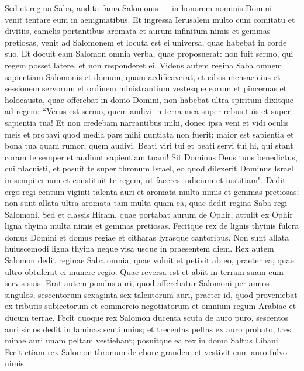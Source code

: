 \begin{biblechapter}  
\verse Sed et regina Saba, audita fama Salomonis — in honorem nominis Domini — venit tentare eum in aenigmatibus. 
\verse Et ingressa Ierusalem multo cum comitatu et divitiis, camelis portantibus aromata et aurum infinitum nimis et gemmas pretiosas, venit ad Salomonem et locuta est ei universa, quae habebat in corde suo. 
\verse Et docuit eam Salomon omnia verba, quae proposuerat: non fuit sermo, qui regem posset latere, et non responderet ei. 
\verse Videns autem regina Saba omnem sapientiam Salomonis et domum, quam aedificaverat, 
\verse et cibos mensae eius et sessionem servorum et ordinem ministrantium vestesque eorum et pincernas et holocausta, quae offerebat in domo Domini, non habebat ultra spiritum 
\verse dixitque ad regem: “Verus est sermo, quem audivi in terra mea super rebus tuis et super sapientia tua! 
\verse Et non credebam narrantibus mihi, donec ipsa veni et vidi oculis meis et probavi quod media pars mihi nuntiata non fuerit; maior est sapientia et bona tua quam rumor, quem audivi. 
\verse Beati viri tui et beati servi tui hi, qui stant coram te semper et audiunt sapientiam tuam! 
\verse Sit Dominus Deus tuus benedictus, cui placuisti, et posuit te super thronum Israel, eo quod dilexerit Dominus Israel in sempiternum et constituit te regem, ut faceres iudicium et iustitiam". 
\verse Dedit ergo regi centum viginti talenta auri et aromata multa nimis et gemmas pretiosas; non sunt allata ultra aromata tam multa quam ea, quae dedit regina Saba regi Salomoni. 
\verse Sed et classis Hiram, quae portabat aurum de Ophir, attulit ex Ophir ligna thyina multa nimis et gemmas pretiosas. 
\verse Fecitque rex de lignis thyinis fulcra domus Domini et domus regiae et citharas lyrasque cantoribus. Non sunt allata huiuscemodi ligna thyina neque visa usque in praesentem diem. 
\verse Rex autem Salomon dedit reginae Saba omnia, quae voluit et petivit ab eo, praeter ea, quae ultro obtulerat ei munere regio. Quae reversa est et abiit in terram suam cum servis suis. 
\verse Erat autem pondus auri, quod afferebatur Salomoni per annos singulos, sescentorum sexaginta sex talentorum auri, 
\verse praeter id, quod proveniebat ex tributis subiectorum et commercio negotiatorum et omnium regum Arabiae et ducum terrae. 
\verse Fecit quoque rex Salomon ducenta scuta de auro puro, sescentos auri siclos dedit in laminas scuti unius; 
\verse et trecentas peltas ex auro probato, tres minae auri unam peltam vestiebant; posuitque ea rex in domo Saltus Libani. 
\verse Fecit etiam rex Salomon thronum de ebore grandem et vestivit eum auro fulvo nimis. 

\end{biblechapter}
